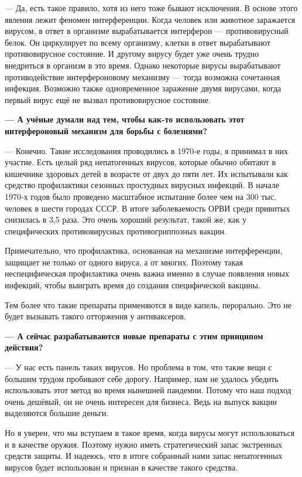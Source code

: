 — Да, есть такое правило, хотя из него тоже бывают исключения. В основе этого явления лежит феномен интерференции. Когда человек или животное заражается вирусом, в ответ в организме вырабатывается интерферон — противовирусный белок. Он циркулирует по всему организму, клетки в ответ вырабатывают противовирусное состояние. И другому вирусу будет уже очень трудно внедриться в организм в это время. Однако некоторые вирусы вырабатывают противодействие интерфероновому механизму — тогда возможна сочетанная инфекция. Возможно также одновременное заражение двумя вирусами, когда первый вирус ещё не вызвал противовирусное состояние.

{\bf — А учёные думали над тем, чтобы как-то использовать этот интерфероновый механизм для борьбы с болезнями? }

— Конечно. Такие исследования проводились в 1970-е годы, я принимал в них участие. Есть целый ряд непатогенных вирусов, которые обычно обитают в кишечнике здоровых детей в возрасте от двух до пяти лет. Их испытывали как средство профилактики сезонных простудных вирусных инфекций. В начале 1970-х годов было проведено масштабное испытание более чем на 300 тыс. человек в шести городах СССР. В итоге заболеваемость ОРВИ среди привитых снизилась в 3,5 раза. Это очень хороший результат, такой же, как у специфических противовирусных противогриппозных вакцин.

\begin{fancyquotes}
    Примечательно, что профилактика, основанная на механизме интерференции, защищает не только от одного вируса, а от многих. Поэтому такая неспецифическая профилактика очень важна именно в случае появления новых инфекций, чтобы выиграть время до создания специфической вакцины.
\end{fancyquotes}

Тем более что такие препараты применяются в виде капель, перорально. Это не будет вызывать такого отторжения у антиваксеров.

{\bf — А сейчас разрабатываются новые препараты с этим принципом действия?}

— У нас есть панель таких вирусов. Но проблема в том, что такие вещи с большим трудом пробивают себе дорогу. Например, нам не удалось убедить использовать этот метод во время нынешней пандемии. Потому что наш подход очень дешёвый, он не очень интересен для бизнеса. Ведь на выпуск вакцин выделяются большие деньги.

Но я уверен, что мы вступаем в такое время, когда вирусы могут использоваться и в качестве оружия. Поэтому нужно иметь стратегический запас экстренных средств защиты. И надеюсь, что в итоге собранный нами запас непатогенных вирусов будет использован и признан в качестве такого средства.

